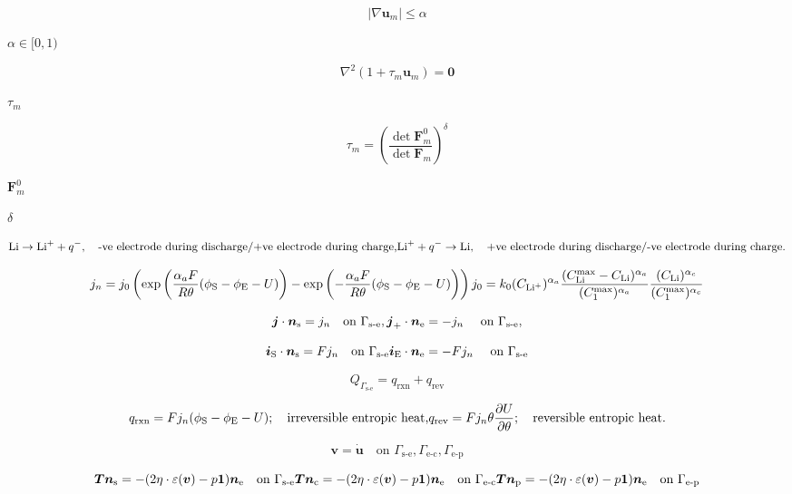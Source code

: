 \documentclass{article}
\begin{document}
\[ |\nabla\boldsymbol{u}_m|\le\alpha \]
\pagebreak

$\alpha\in[0,1)$
\pagebreak

\[ \nabla^2(1+\tau_m\boldsymbol{u}_m)=\boldsymbol{0} \]
\pagebreak

$\tau_m$
\pagebreak

\[ \tau_m=\left(\frac{\det \boldsymbol{F}_m^0}{\det \boldsymbol{F}_m} \right)^\delta \]
\pagebreak

$\boldsymbol{F}_m^0$
\pagebreak

$\delta$
\pagebreak

\[ \text{Li}\to \text{Li}^++q^-, \quad \text{-ve electrode during discharge/+ve electrode during charge,}\nonumber\\ \text{Li}^++q^- \to\text{Li},\quad \text{+ve electrode during discharge/-ve electrode during charge}.\nonumber \]
\pagebreak

\[ j_n=j_0\left(\text{exp}\left(\frac{\alpha_aF}{R\theta}(\phi_\text{S}-\phi_\text{E}-U)\right)-\text{exp}\left(-\frac{\alpha_aF}{R\theta}(\phi_\text{S}-\phi_\text{E}-U)\right)\right) \label{eq:BVeuqation}\\ j_0=k_0(C_{\text{Li}^+})^{\alpha_a} \frac{(C_\text{Li}^{\text{max}}-C_\text{Li})^{\alpha_a}}{(C_1^{\text{max}})^{\alpha_a}} \frac{(C_\text{Li})^{\alpha_c}}{{(C_1^\text{max}})^{\alpha_c}} \]
\pagebreak

\[ \boldsymbol{j}\cdot \boldsymbol{n}_\text{s}=j_n \quad \text{on } \Gamma_\text{s-e},\\ \boldsymbol{j}_+\cdot \boldsymbol{n}_\text{e}=-j_n\ \quad \text{on } \Gamma_\text{s-e}, \]
\pagebreak

\[ \boldsymbol{i}_\text{S}\cdot\boldsymbol{n}_\text{s}=Fj_n \quad \text{on } \Gamma_\text{s-e}\\ \boldsymbol{i}_\text{E}\cdot\boldsymbol{n}_\text{e}=-Fj_n \ \quad \text{on } \Gamma_\text{s-e} \]
\pagebreak

\[ Q_{\Gamma_\text{s-e}}=q_{\text{rxn}}+q_{\text{rev}} \]
\pagebreak

\[ q_{\text{rxn}}=Fj_n(\phi_\text{S}-\phi_\text{E}-U) ;\quad \text{irreversible entropic heat,} \\ q_{\text{rev}}=Fj_n\theta\frac{\partial U}{\partial \theta};\quad\text{reversible entropic heat.} \]
\pagebreak

\[ \boldsymbol{v}=\dot{\boldsymbol{u}} \quad \text{on } \Gamma_\text{s-e}, \Gamma_\text{e-c}, \Gamma_\text{e-p} \]
\pagebreak

\[ \boldsymbol{T}\boldsymbol{n}_\text{s}=-(2\eta\cdot\varepsilon(\boldsymbol{v})-p\boldsymbol{1})\boldsymbol{n}_\text{e} \quad \text{on } \Gamma_\text{s-e} \\ \boldsymbol{T}\boldsymbol{n}_\text{c}=-(2\eta\cdot\varepsilon(\boldsymbol{v})-p\boldsymbol{1})\boldsymbol{n}_\text{e} \quad \text{on } \Gamma_\text{e-c} \\ \boldsymbol{T}\boldsymbol{n}_\text{p}=-(2\eta\cdot\varepsilon(\boldsymbol{v})-p\boldsymbol{1})\boldsymbol{n}_\text{e} \quad \text{on } \Gamma_\text{e-p} \]
\pagebreak
\end{document}
